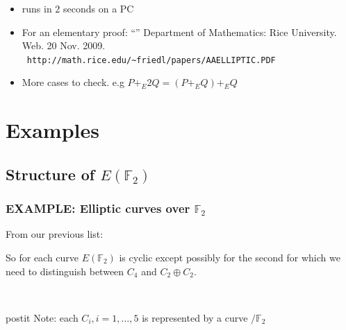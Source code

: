 \documentclass[10pt,handout]{beamer} %
\newcommand{\F}{\mathbb F}
\theoremstyle{definition}
\begin{document}
\begin{frame}
\begin{small}
\begin{itemize}[<+-| alert@+>]
 \item runs in 2 seconds on a PC
 \item For an elementary proof:
 ``''
Department of Mathematics: Rice
University. Web. 20 Nov. 2009.\\ \ \hfill\texttt{http://math.rice.edu/\~{}friedl/papers/AAELLIPTIC.PDF}
\item More cases to check. e.g  \alert{$P+_E2Q=(P+_EQ)+_EQ$}
\end{itemize}
\end{small}
\end{frame}



\section{Examples}
\subsection{Structure of \texorpdfstring{$E(\F_2)$}{E(F2)}}
\begin{frame}
\frametitle{EXAMPLE: Elliptic curves over $\F_2$}

From our previous list:
\pause
So for each curve $E(\F_2)$ is cyclic except possibly for the second for which we need to distinguish between
$C_4$ and $C_2\oplus C_2$.\pause

\ \hfill \begin{beamercolorbox}[center,wd=9cm]{postit}
Note: each $C_i, i=1,\ldots,5$ is represented by a curve $/\F_2$
            \end{beamercolorbox}
\end{frame}
\end{document}
